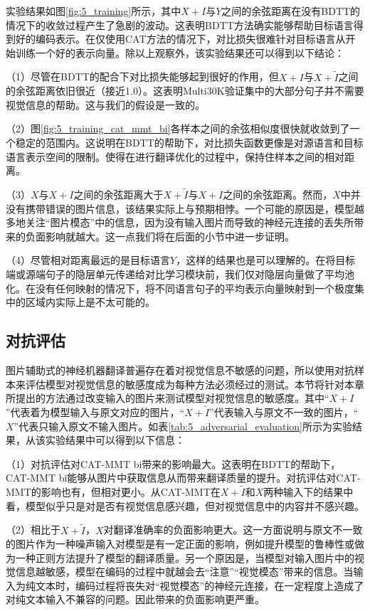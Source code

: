 实验结果如图\ref{fig:5_training}所示，其中$X+I$与$Y$之间的余弦距离在没有BDTT的情况下的收敛过程产生了急剧的波动。这表明BDTT方法确实能够帮助目标语言得到好的编码表示。在仅使用CAT方法的情况下，对比损失很难针对目标语言从开始训练一个好的表示向量。除以上观察外，该实验结果还可以得到以下结论：

（1）尽管在BDTT的配合下对比损失能够起到很好的作用，但$X+I$与$X+\tilde{I}$之间的余弦距离依旧很近（接近1.0）。这表明Multi30K验证集中的大部分句子并不需要视觉信息的帮助。这与我们的假设是一致的。

（2）图\ref{fig:5_training_cat_mmt_bi}各样本之间的余弦相似度很快就收敛到了一个稳定的范围内。这说明在BDTT的帮助下，对比损失函数更像是对源语言和目标语言表示空间的限制。使得在进行翻译优化的过程中，保持住样本之间的相对距离。

（3）$X$与$X+I$之间的余弦距离大于$X+\tilde{I}$与$X+I$之间的余弦距离。然而，$X$中并没有携带错误的图片信息，该结果实际上与预期相悖。一个可能的原因是，模型越多地关注“图片模态”中的信息，因为没有输入图片而导致的神经元连接的丢失所带来的负面影响就越大。这一点我们将在后面的小节中进一步证明。

（4）尽管相对距离最远的是目标语言$Y$，这样的结果也是可以理解的。在将目标端或源端句子的隐层单元传递给对比学习模块前，我们仅对隐层向量做了平均池化。在没有任何映射的情况下，将不同语言句子的平均表示向量映射到一个极度集中的区域内实际上是不太可能的。

\subsection{对抗评估}
\label{sec:5_adversarial_evaluation}

图片辅助式的神经机器翻译普遍存在着对视觉信息不敏感的问题，所以使用对抗样本来评估模型对视觉信息的敏感度成为每种方法必须经过的测试。本节将针对本章所提出的方法通过改变输入的图片来测试模型对视觉信息的敏感度。其中“$X+I$”代表着为模型输入与原文对应的图片，“$X+\tilde{I}$”代表输入与原文不一致的图片，“$X$”代表只输入原文不输入图片。如表\ref{tab:5_adversarial_evaluation}所示为实验结果，从该实验结果中可以得到以下信息：

（1）对抗评估对CAT-MMT bi带来的影响最大。这表明在BDTT的帮助下，CAT-MMT bi能够从图片中获取信息从而带来翻译质量的提升。对抗评估对CAT-MMT的影响也有，但相对更小。从CAT-MMT在$X+\tilde{I}$和$X$两种输入下的结果中看，模型似乎只是对是否有视觉信息感兴趣，但对视觉信息中的内容并不感兴趣。

（2）相比于$X+\tilde{I}$，$X$对翻译准确率的负面影响更大。这一方面说明与原文不一致的图片作为一种噪声输入对模型是有一定正面的影响，例如提升模型的鲁棒性或做为一种正则方法提升了模型的翻译质量\cite{20_wu-etal-2021-good}。另一个原因是，当模型对输入图片中的视觉信息越敏感，模型在编码的过程中就越会去“注意”“视觉模态”带来的信息。当输入为纯文本时，编码过程将丧失对“视觉模态”的神经元连接，在一定程度上造成了对纯文本输入不兼容的问题。因此带来的负面影响更严重。

